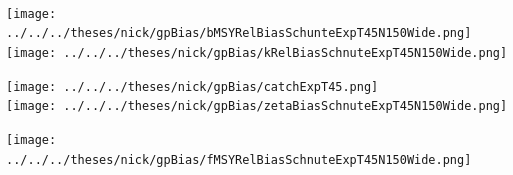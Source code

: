 \documentclass[ xcolor = pdftex, dvipsnames, table ]{beamer}
\begin{document}
%
\begin{frame}%
$~$
\hspace*{-1.25cm}
\begin{minipage}[h!]{0.33\textwidth}
\hspace*{0.25cm}
\texttt{[image: ../../../theses/nick/gpBias/bMSYRelBiasSchunteExpT45N150Wide.png]}\\
\hspace*{0.25cm}
\texttt{[image: ../../../theses/nick/gpBias/kRelBiasSchnuteExpT45N150Wide.png]}
\end{minipage}
\begin{minipage}[h!]{0.33\textwidth}
\hspace*{0.75cm}
\texttt{[image: ../../../theses/nick/gpBias/catchExpT45.png]}\\
\hspace*{0.75cm}
\texttt{[image: ../../../theses/nick/gpBias/zetaBiasSchnuteExpT45N150Wide.png]}
\end{minipage}
\begin{minipage}[h!]{0.33\textwidth}
\hspace*{1cm}
\hspace*{1cm}
\texttt{[image: ../../../theses/nick/gpBias/fMSYRelBiasSchnuteExpT45N150Wide.png]}
\end{minipage}
\end{frame}
\end{document}
